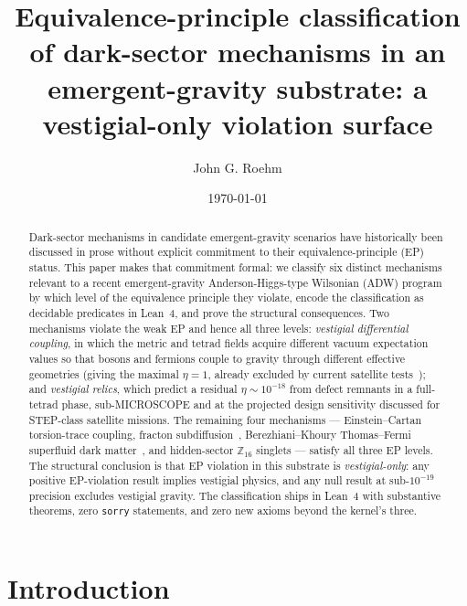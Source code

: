 \documentclass[twocolumn]{revtex4-2}
\begin{document}
\title{Equivalence-principle classification of dark-sector mechanisms in
an emergent-gravity substrate: a vestigial-only violation surface}

\author{John G. Roehm}

\date{\today}

\begin{abstract}
Dark-sector mechanisms in candidate emergent-gravity scenarios have
historically been discussed in prose without explicit commitment to
their equivalence-principle (EP) status. This paper makes that
commitment formal: we classify six distinct mechanisms relevant to a
recent emergent-gravity Anderson-Higgs-type Wilsonian (ADW) program by
which level of the equivalence principle they violate, encode the
classification as decidable predicates in Lean~4, and prove the
structural consequences. Two mechanisms violate the weak EP and hence
all three levels: \emph{vestigial differential coupling}, in which the
metric and tetrad fields acquire different vacuum expectation values so
that bosons and fermions couple to gravity through different effective
geometries (giving the maximal $\eta = 1$, already excluded by current
satellite tests~\cite{Touboul2017}); and \emph{vestigial relics}, which
predict a residual $\eta \sim 10^{-18}$ from defect remnants in a
full-tetrad phase, sub-MICROSCOPE and at the projected design
sensitivity discussed for STEP-class satellite missions. The remaining four mechanisms --- Einstein--Cartan
torsion-trace coupling, fracton subdiffusion~\cite{Pretko2017},
Berezhiani--Khoury Thomas--Fermi superfluid dark
matter~\cite{Berezhiani2015}, and hidden-sector $\mathbb{Z}_{16}$
singlets --- satisfy all three EP levels. The structural conclusion is
that EP violation in this substrate is \emph{vestigial-only}: any
positive EP-violation result implies vestigial physics, and any
null result at sub-$10^{-19}$ precision excludes vestigial gravity. The
classification ships in Lean~4 with \epThms{} substantive theorems, zero
\texttt{sorry} statements, and zero new axioms beyond the kernel's
three.
\end{abstract}

\maketitle

\section{Introduction}
\label{sec:intro}
\end{document}
